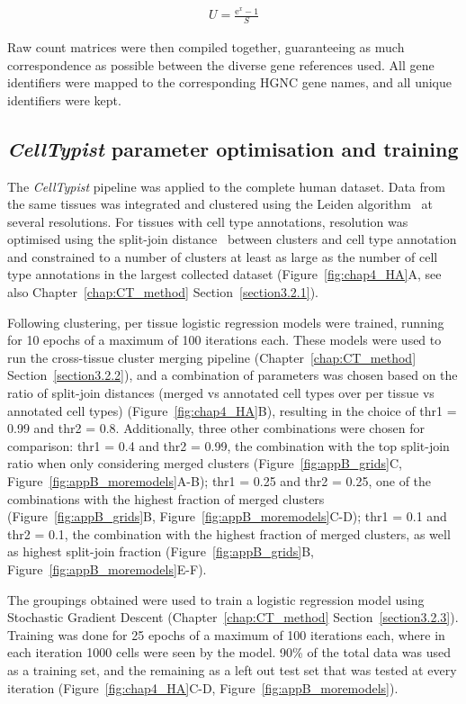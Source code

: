 \begin{align}
U = \frac{\mathrm{e}^{x} - 1}{S}
\end{align}

Raw count matrices were then compiled together, guaranteeing as much correspondence as possible between the diverse gene references used. All gene identifiers were mapped to the corresponding HGNC gene names, and all unique identifiers were kept.


\subsection{\textit{CellTypist} parameter optimisation and training}
\label{section4.4_model}
The \textit{CellTypist} pipeline was applied to the complete human dataset. Data from the same tissues was integrated and clustered using the Leiden algorithm~\citep{traag_louvain_2019} at several resolutions. For tissues with cell type annotations, resolution was optimised using the split-join distance~\citep{dongen_performance_2000} between clusters and cell type annotation and constrained to a number of clusters at least as large as the number of cell type annotations in the largest collected dataset (Figure~\ref{fig:chap4_HA}A, see also Chapter~\ref{chap:CT_method} Section~\ref{section3.2.1}).

Following clustering, per tissue logistic regression models were trained, running for 10 epochs of a maximum of 100 iterations each. These models were used to run the cross-tissue cluster merging pipeline (Chapter~\ref{chap:CT_method} Section~\ref{section3.2.2}), and a combination of parameters was chosen based on the ratio of split-join distances (merged vs annotated cell types over per tissue vs annotated cell types) (Figure~\ref{fig:chap4_HA}B), resulting in the choice of thr1 = 0.99 and thr2 = 0.8. Additionally, three other combinations were chosen for comparison: thr1 = 0.4 and thr2 = 0.99, the combination with the top split-join ratio when only considering merged clusters (Figure~\ref{fig:appB_grids}C, Figure~\ref{fig:appB_moremodels}A-B); thr1 = 0.25 and thr2 = 0.25, one of the combinations with the highest fraction of merged clusters (Figure~\ref{fig:appB_grids}B, Figure~\ref{fig:appB_moremodels}C-D); thr1 = 0.1 and thr2 = 0.1, the combination with the highest fraction of merged clusters, as well as highest split-join fraction (Figure~\ref{fig:appB_grids}B, Figure~\ref{fig:appB_moremodels}E-F).

The groupings obtained were used to train a logistic regression model using Stochastic Gradient Descent (Chapter~\ref{chap:CT_method} Section~\ref{section3.2.3}). Training was done for 25 epochs of a maximum of 100 iterations each, where in each iteration 1000 cells were seen by the model. 90\% of the total data was used as a training set, and the remaining as a left out test set that was tested at every iteration (Figure~\ref{fig:chap4_HA}C-D, Figure~\ref{fig:appB_moremodels}).



